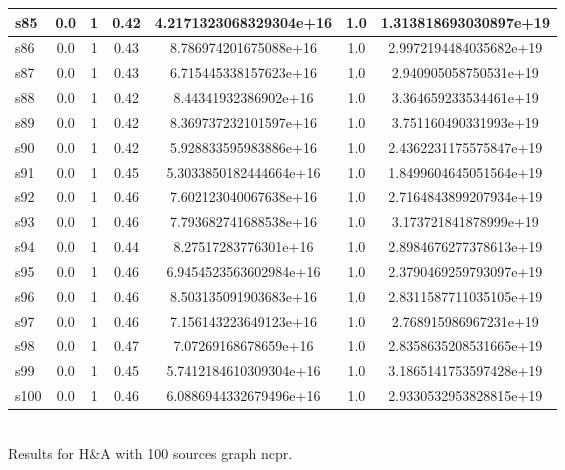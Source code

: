 \documentclass{article}
\begin{document}
\begin{tabular}{|l|c|c|c|c|c|c|}
s85 &0.0 & 1 & 0.42 & 4.2171323068329304e+16 & 1.0 & 1.313818693030897e+19\\
\hline
s86 &0.0 & 1 & 0.43 & 8.786974201675088e+16 & 1.0 & 2.9972194484035682e+19\\
\hline
s87 &0.0 & 1 & 0.43 & 6.715445338157623e+16 & 1.0 & 2.940905058750531e+19\\
\hline
s88 &0.0 & 1 & 0.42 & 8.44341932386902e+16 & 1.0 & 3.364659233534461e+19\\
\hline
s89 &0.0 & 1 & 0.42 & 8.369737232101597e+16 & 1.0 & 3.751160490331993e+19\\
\hline
s90 &0.0 & 1 & 0.42 & 5.928833595983886e+16 & 1.0 & 2.4362231175575847e+19\\
\hline
s91 &0.0 & 1 & 0.45 & 5.3033850182444664e+16 & 1.0 & 1.8499604645051564e+19\\
\hline
s92 &0.0 & 1 & 0.46 & 7.602123040067638e+16 & 1.0 & 2.7164843899207934e+19\\
\hline
s93 &0.0 & 1 & 0.46 & 7.793682741688538e+16 & 1.0 & 3.173721841878999e+19\\
\hline
s94 &0.0 & 1 & 0.44 & 8.27517283776301e+16 & 1.0 & 2.8984676277378613e+19\\
\hline
s95 &0.0 & 1 & 0.46 & 6.9454523563602984e+16 & 1.0 & 2.3790469259793097e+19\\
\hline
s96 &0.0 & 1 & 0.46 & 8.503135091903683e+16 & 1.0 & 2.8311587711035105e+19\\
\hline
s97 &0.0 & 1 & 0.46 & 7.156143223649123e+16 & 1.0 & 2.768915986967231e+19\\
\hline
s98 &0.0 & 1 & 0.47 & 7.07269168678659e+16 & 1.0 & 2.8358635208531665e+19\\
\hline
s99 &0.0 & 1 & 0.45 & 5.7412184610309304e+16 & 1.0 & 3.1865141753597428e+19\\
\hline
s100 &0.0 & 1 & 0.46 & 6.0886944332679496e+16 & 1.0 & 2.9330532953828815e+19\\
\hline
\end{tabular}\\

\noindent Results for H\&A with 100 sources graph ncpr.
\end{document}

